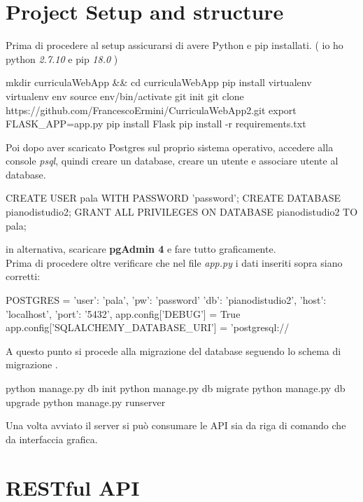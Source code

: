 \documentclass{article}
\begin{document}
\section{Project Setup and structure}
Prima di procedere al setup assicurarsi di avere Python e pip installati. ( io ho python \textit{2.7.10} e pip \textit{18.0} ) 
\begin{shell}[caption=Setup Flask]
mkdir curriculaWebApp && cd curriculaWebApp
pip install virtualenv
virtualenv env
source env/bin/activate
git init
git clone https://github.com/FrancescoErmini/CurriculaWebApp2.git
export FLASK_APP=app.py
pip install Flask
pip install -r requirements.txt
\end{shell}
Poi dopo aver scaricato Postgres sul  proprio sistema operativo, accedere alla console \emph{psql}, quindi creare un database, creare un utente e associare utente al database.
\begin{shell}[caption=Create database]
CREATE USER pala WITH PASSWORD 'password';
CREATE DATABASE pianodistudio2;
GRANT ALL PRIVILEGES ON DATABASE pianodistudio2 TO pala;
\end{shell}
in alternativa, scaricare \textbf{pgAdmin 4} e fare tutto graficamente.\\
Prima di procedere oltre verificare che nel file \emph{app.py} i dati inseriti sopra siano corretti:
\begin{python}[firstnumber=16, caption=Flask db configuration]
POSTGRES = {
    'user': 'pala',
    'pw': 'password'
    'db': 'pianodistudio2',
    'host': 'localhost',
    'port': '5432',
}
app.config['DEBUG'] = True
app.config['SQLALCHEMY_DATABASE_URI'] = 'postgresql://%
\end{python}
A questo punto si procede alla migrazione del database seguendo lo schema di migrazione \cite{ref1}. 
\begin{shell}[caption=Initialize database]
python manage.py db init
python manage.py db migrate
python manage.py db upgrade
python manage.py runserver
\end{shell}
Una volta avviato il server si può consumare le API sia da riga di comando che da interfaccia grafica.

\newpage
\section{RESTful API}
\end{document}
